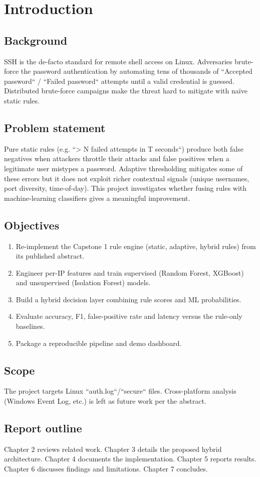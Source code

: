 \chapter{Introduction}

\section{Background}
SSH is the de-facto standard for remote shell access on Linux. Adversaries
brute-force the password authentication by automating tens of thousands of
``Accepted password`` / ``Failed password`` attempts until a valid
credential is guessed. Distributed brute-force campaigns make the threat
hard to mitigate with naïve static rules.

\section{Problem statement}
Pure static rules (e.g. ``> N failed attempts in T seconds``) produce both
false negatives when attackers throttle their attacks and false positives
when a legitimate user mistypes a password. Adaptive thresholding mitigates
some of these errors but it does not exploit richer contextual signals
(unique usernames, port diversity, time-of-day). This project investigates
whether fusing rules with machine-learning classifiers gives a meaningful
improvement.

\section{Objectives}
\begin{enumerate}
  \item Re-implement the Capstone 1 rule engine (static, adaptive, hybrid rules) from its published abstract.
  \item Engineer per-IP features and train supervised (Random Forest, XGBoost) and unsupervised (Isolation Forest) models.
  \item Build a hybrid decision layer combining rule scores and ML probabilities.
  \item Evaluate accuracy, F1, false-positive rate and latency versus the rule-only baselines.
  \item Package a reproducible pipeline and demo dashboard.
\end{enumerate}

\section{Scope}
The project targets Linux ``auth.log``/``secure`` files. Cross-platform
analysis (Windows Event Log, etc.) is left as future work per the abstract.

\section{Report outline}
Chapter 2 reviews related work. Chapter 3 details the proposed hybrid
architecture. Chapter 4 documents the implementation. Chapter 5 reports
results. Chapter 6 discusses findings and limitations. Chapter 7 concludes.
